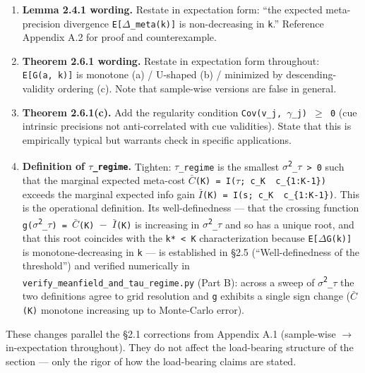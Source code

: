 \documentclass{article}
\begin{document}
\begin{enumerate}
\def\labelenumi{\arabic{enumi}.}
\item
  \textbf{Lemma 2.4.1 wording.} Restate in expectation form: ``the
  expected meta-precision divergence \texttt{E{[}\ensuremath{\Delta}\_meta(k){]}} is
  non-decreasing in \texttt{k}.'' Reference Appendix A.2 for proof and
  counterexample.
\item
  \textbf{Theorem 2.6.1 wording.} Restate in expectation form
  throughout: \texttt{E{[}G(a,\ k){]}} is monotone (a) / U-shaped (b) /
  minimized by descending-validity ordering (c). Note that sample-wise
  versions are false in general.
\item
  \textbf{Theorem 2.6.1(c).} Add the regularity condition
  \texttt{Cov(v\_j,\ \ensuremath{\gamma}\_j)\ \ensuremath{\geq}\ 0} (cue intrinsic precisions not
  anti-correlated with cue validities). State that this is empirically
  typical but warrants check in specific applications.
\item
  \textbf{Definition of \texttt{\ensuremath{\tau}\_regime}.} Tighten: \texttt{\ensuremath{\tau}\_regime}
  is the smallest \texttt{\ensuremath{\sigma}\textsuperscript{2}\_\ensuremath{\tau}\ \textgreater{}\ 0} such that the
  marginal expected meta-cost
  \texttt{\ensuremath{\bar{C}}(K)\ =\ I(\ensuremath{\tau};\ c\_K\ \textbar{}\ c\_\{1:K-1\})} exceeds the
  marginal expected info gain
  \texttt{\ensuremath{\bar{I}}(K)\ =\ I(s;\ c\_K\ \textbar{}\ c\_\{1:K-1\})}. This is the
  operational definition. Its well-definedness --- that the crossing
  function \texttt{g(\ensuremath{\sigma}\textsuperscript{2}\_\ensuremath{\tau})\ =\ \ensuremath{\bar{C}}(K)\ \ensuremath{-}\ \ensuremath{\bar{I}}(K)} is increasing in
  \texttt{\ensuremath{\sigma}\textsuperscript{2}\_\ensuremath{\tau}} and so has a unique root, and that this root coincides
  with the \texttt{k*\ \textless{}\ K} characterization because
  \texttt{E{[}\ensuremath{\Delta}G(k){]}} is monotone-decreasing in \texttt{k} --- is
  established in \S{}2.5 (``Well-definedness of the threshold'') and
  verified numerically in
  \texttt{verify\_meanfield\_and\_tau\_regime.py} (Part B): across a
  sweep of \texttt{\ensuremath{\sigma}\textsuperscript{2}\_\ensuremath{\tau}} the two definitions agree to grid resolution
  and \texttt{g} exhibits a single sign change (\texttt{\ensuremath{\bar{C}}(K)} monotone
  increasing up to Monte-Carlo error).
\end{enumerate}

These changes parallel the \S{}2.1 corrections from Appendix A.1
(sample-wise \ensuremath{\rightarrow} in-expectation throughout). They do not affect the
load-bearing structure of the section --- only the rigor of how the
load-bearing claims are stated.
\end{document}
